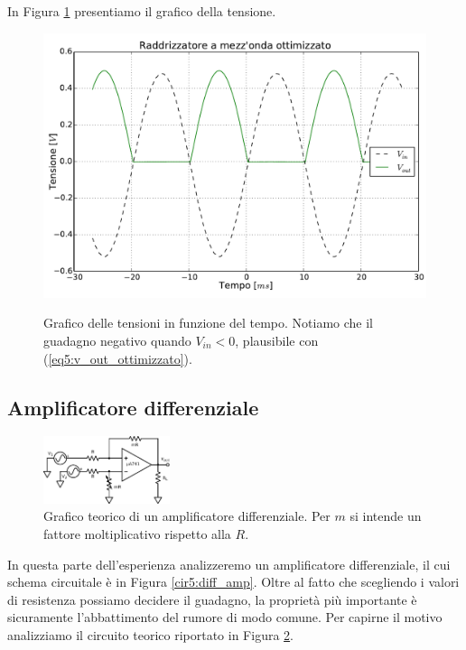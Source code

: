 In Figura \ref{gr5:secondo_raddrizzatore} presentiamo il grafico della tensione.

\begin{figure}[ht]
 \centering
   {\includegraphics[width=14.5cm]{../E05/latex/radd_ott.pdf}}
 \caption{Grafico delle tensioni in funzione del tempo. Notiamo che il guadagno negativo quando $V_{in}<0$, plausibile con (\ref{eq5:v_out_ottimizzato}).}
 \label{gr5:secondo_raddrizzatore}
\end{figure}

\subsection{Amplificatore differenziale}

\begin{figure}
  \begin{center}
    \includegraphics[width=0.33\textwidth]{../E05/latex/c_teo_diff_amp.pdf}
  \end{center}
  \caption{Grafico teorico di un amplificatore differenziale. Per $m$ si intende un fattore moltiplicativo rispetto alla $R$.}
  \label{cir5:diff_amp_teo}
\end{figure}

In questa parte dell'esperienza analizzeremo un amplificatore differenziale, il cui schema circuitale è in Figura \ref{cir5:diff_amp}. Oltre al fatto che scegliendo i valori di resistenza possiamo decidere il guadagno, la proprietà più importante è sicuramente l'abbattimento del rumore di modo comune. Per capirne il motivo analizziamo il circuito teorico riportato in Figura \ref{cir5:diff_amp_teo}.

